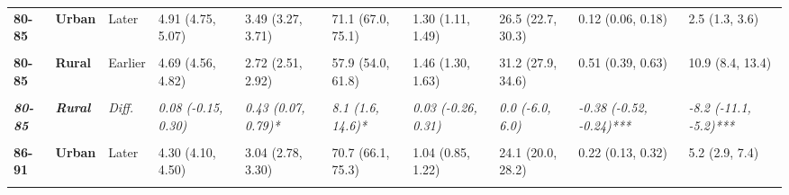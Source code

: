 \begin{table}[!h]
{{\begin{tabular}[t]{>{}l>{}lllllllll}
\cmidrule{1-10}
\textbf{80-85} & \textbf{Urban} & Later & 4.91 (4.75, 5.07) & 3.49 (3.27, 3.71) & 71.1 (67.0, 75.1) & 1.30 (1.11, 1.49) & 26.5 (22.7, 30.3) & 0.12 (0.06, 0.18) & 2.5 (1.3, 3.6)\\
\cmidrule{1-10}
\em{\textbf{\cellcolor{gray!10}{80-85}}} & \em{\textbf{\cellcolor{gray!10}{Urban}}} & \em{\cellcolor{gray!10}{Diff.}} & \em{\cellcolor{gray!10}{0.05 (-0.16, 0.25)}} & \em{\cellcolor{gray!10}{0.62 (0.30, 0.95)***}} & \em{\cellcolor{gray!10}{12.2 (6.0, 18.3)***}} & \em{\cellcolor{gray!10}{-0.23 (-0.55, 0.08)}} & \em{\cellcolor{gray!10}{-5.0 (-11.4, 1.3)}} & \em{\cellcolor{gray!10}{-0.35 (-0.51, -0.18)***}} & \em{\cellcolor{gray!10}{-7.1 (-10.5, -3.8)***}}\\
\cmidrule{1-10}
\textbf{80-85} & \textbf{Rural} & Earlier & 4.69 (4.56, 4.82) & 2.72 (2.51, 2.92) & 57.9 (54.0, 61.8) & 1.46 (1.30, 1.63) & 31.2 (27.9, 34.6) & 0.51 (0.39, 0.63) & 10.9 (8.4, 13.4)\\
\cmidrule{1-10}
\textbf{\cellcolor{gray!10}{80-85}} & \textbf{\cellcolor{gray!10}{Rural}} & \cellcolor{gray!10}{Later} & \cellcolor{gray!10}{4.77 (4.59, 4.95)} & \cellcolor{gray!10}{3.15 (2.85, 3.44)} & \cellcolor{gray!10}{66.0 (60.8, 71.2)} & \cellcolor{gray!10}{1.49 (1.26, 1.72)} & \cellcolor{gray!10}{31.3 (26.3, 36.2)} & \cellcolor{gray!10}{0.13 (0.05, 0.21)} & \cellcolor{gray!10}{2.7 (1.1, 4.3)}\\
\cmidrule{1-10}
\em{\textbf{80-85}} & \em{\textbf{Rural}} & \em{Diff.} & \em{0.08 (-0.15, 0.30)} & \em{0.43 (0.07, 0.79)*} & \em{8.1 (1.6, 14.6)*} & \em{0.03 (-0.26, 0.31)} & \em{0.0 (-6.0, 6.0)} & \em{-0.38 (-0.52, -0.24)***} & \em{-8.2 (-11.1, -5.2)***}\\
\cmidrule{1-10}
\textbf{\cellcolor{gray!10}{86-91}} & \textbf{\cellcolor{gray!10}{Urban}} & \cellcolor{gray!10}{Earlier} & \cellcolor{gray!10}{4.05 (3.92, 4.18)} & \cellcolor{gray!10}{2.58 (2.40, 2.77)} & \cellcolor{gray!10}{63.8 (59.8, 67.8)} & \cellcolor{gray!10}{1.26 (1.09, 1.43)} & \cellcolor{gray!10}{31.2 (27.1, 35.2)} & \cellcolor{gray!10}{0.20 (0.13, 0.28)} & \cellcolor{gray!10}{5.0 (3.2, 6.8)}\\
\cmidrule{1-10}
\textbf{86-91} & \textbf{Urban} & Later & 4.30 (4.10, 4.50) & 3.04 (2.78, 3.30) & 70.7 (66.1, 75.3) & 1.04 (0.85, 1.22) & 24.1 (20.0, 28.2) & 0.22 (0.13, 0.32) & 5.2 (2.9, 7.4)\\
\cmidrule{1-10}
\em{\textbf{\cellcolor{gray!10}{86-91}}} & \em{\textbf{\cellcolor{gray!10}{Urban}}} & \em{\cellcolor{gray!10}{Diff.}} & \em{\cellcolor{gray!10}{0.25 (0.01, 0.49)*}} & \em{\cellcolor{gray!10}{0.46 (0.14, 0.77)**}} & \em{\cellcolor{gray!10}{6.9 (0.8, 13.0)*}} & \em{\cellcolor{gray!10}{-0.23 (-0.48, 0.02)}} & \em{\cellcolor{gray!10}{-7.1 (-12.9, -1.3)*}} & \em{\cellcolor{gray!10}{0.02 (-0.10, 0.14)}} & \em{\cellcolor{gray!10}{0.2 (-2.7, 3.1)}}\\

\end{tabular}}}
\end{table}
